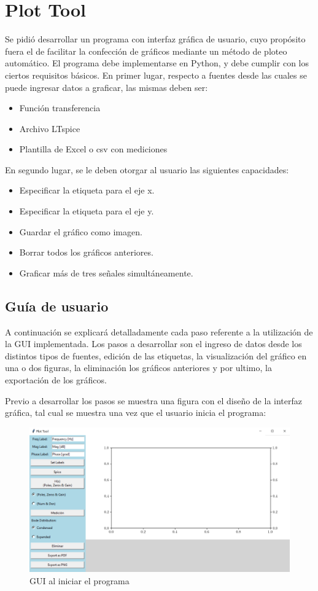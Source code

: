 
\section{Plot Tool}
Se pidió desarrollar un programa con interfaz gráfica de usuario, cuyo propósito fuera el de facilitar la confección de gráficos mediante un método de ploteo automático. El programa debe implementarse en Python, y debe cumplir con los ciertos requisitos básicos. 
En primer lugar, respecto a fuentes desde las cuales se puede ingresar datos a graficar, las mismas deben ser:
\begin{itemize}
\item Función transferencia
\item Archivo LTspice
\item Plantilla de Excel o csv con mediciones
\end{itemize}
En segundo lugar, se le deben otorgar al usuario las siguientes capacidades:
\begin{itemize}
\item Especificar la etiqueta para el eje x.
\item Especificar la etiqueta para el eje y.
\item Guardar el gráfico como imagen.
\item Borrar todos los gráficos anteriores.
\item Graficar más de tres señales simultáneamente.
\end{itemize}

\subsection{Guía de usuario}
A continuación se explicará detalladamente cada paso referente a la utilización de la GUI implementada. Los pasos a desarrollar son el ingreso de datos desde los distintos tipos de fuentes, edición de las etiquetas, la visualización del gráfico en una o dos figuras, la eliminación los gráficos anteriores y por ultimo, la exportación de los gráficos.

Previo a desarrollar los pasos se muestra una figura con el diseño de la interfaz gráfica, tal cual se muestra una vez que el usuario inicia el programa:

\begin{figure}[ht]
\centering
\includegraphics[scale=0.2]{resources/window.png}
\caption{GUI al iniciar el programa}
\label{fig:window}
\end{figure}

